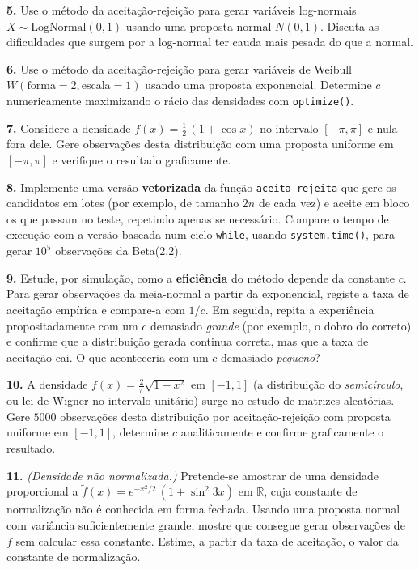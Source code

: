 \documentclass[
  portuguese,
  11pt,
  openany]{book}
\begin{document}
\textbf{5.} Use o método da aceitação-rejeição para gerar variáveis log-normais
\(X \sim \text{LogNormal}(0, 1)\) usando uma proposta normal \(N(0, 1)\). Discuta as
dificuldades que surgem por a log-normal ter cauda mais pesada do que a normal.

\textbf{6.} Use o método da aceitação-rejeição para gerar variáveis de Weibull
\(W(\text{forma}=2, \text{escala}=1)\) usando uma proposta exponencial. Determine
\(c\) numericamente maximizando o rácio das densidades com \texttt{optimize()}.

\textbf{7.} Considere a densidade \(f(x) = \frac{1}{2}\,(1 + \cos x)\) no intervalo
\([-\pi, \pi]\) e nula fora dele. Gere observações desta distribuição com uma
proposta uniforme em \([-\pi, \pi]\) e verifique o resultado graficamente.

\textbf{8.} Implemente uma versão \textbf{vetorizada} da função \texttt{aceita\_rejeita} que gere
os candidatos em lotes (por exemplo, de tamanho \(2n\) de cada vez) e aceite em
bloco os que passam no teste, repetindo apenas se necessário. Compare o tempo de
execução com a versão baseada num ciclo \texttt{while}, usando \texttt{system.time()}, para
gerar \(10^5\) observações da Beta(2,2).

\textbf{9.} Estude, por simulação, como a \textbf{eficiência} do método depende da
constante \(c\). Para gerar observações da meia-normal a partir da exponencial,
registe a taxa de aceitação empírica e compare-a com \(1/c\). Em seguida, repita a
experiência propositadamente com um \(c\) demasiado \emph{grande} (por exemplo, o dobro
do correto) e confirme que a distribuição gerada continua correta, mas que a
taxa de aceitação cai. O que aconteceria com um \(c\) demasiado \emph{pequeno}?

\textbf{10.} A densidade \(f(x) = \frac{2}{\pi}\sqrt{1 - x^2}\) em \([-1, 1]\) (a
distribuição do \emph{semicírculo}, ou lei de Wigner no intervalo unitário) surge no
estudo de matrizes aleatórias. Gere \(5000\) observações desta distribuição por
aceitação-rejeição com proposta uniforme em \([-1,1]\), determine \(c\)
analiticamente e confirme graficamente o resultado.

\textbf{11.} \emph{(Densidade não normalizada.)} Pretende-se amostrar de uma densidade
proporcional a \(\tilde f(x) = e^{-x^2/2}\,(1 + \sin^2 3x)\) em \(\mathbb{R}\), cuja
constante de normalização não é conhecida em forma fechada. Usando uma proposta
normal com variância suficientemente grande, mostre que consegue gerar
observações de \(f\) sem calcular essa constante. Estime, a partir da taxa de
aceitação, o valor da constante de normalização.
\end{document}
